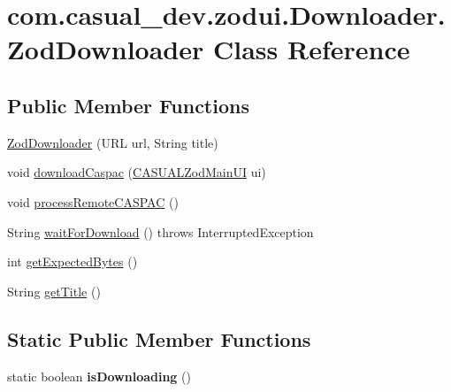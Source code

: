 \hypertarget{classcom_1_1casual__dev_1_1zodui_1_1_downloader_1_1_zod_downloader}{\section{com.\-casual\-\_\-dev.\-zodui.\-Downloader.\-Zod\-Downloader Class Reference}
\label{classcom_1_1casual__dev_1_1zodui_1_1_downloader_1_1_zod_downloader}
}
\subsection*{Public Member Functions}
\begin{DoxyCompactItemize}
\item 
\hyperlink{classcom_1_1casual__dev_1_1zodui_1_1_downloader_1_1_zod_downloader_a65d7dc35de638ea05b854ffa122a676a}{Zod\-Downloader} (U\-R\-L url, String title)
\item 
void \hyperlink{classcom_1_1casual__dev_1_1zodui_1_1_downloader_1_1_zod_downloader_a0aaf6cb62cee004e9c64ce3f2363b1c4}{download\-Caspac} (\hyperlink{classcom_1_1casual__dev_1_1zodui_1_1_c_a_s_u_a_l_zod_main_u_i}{C\-A\-S\-U\-A\-L\-Zod\-Main\-U\-I} ui)
\item 
void \hyperlink{classcom_1_1casual__dev_1_1zodui_1_1_downloader_1_1_zod_downloader_a3b8bfeff8b7059d743400f54bf1d01d0}{process\-Remote\-C\-A\-S\-P\-A\-C} ()
\item 
String \hyperlink{classcom_1_1casual__dev_1_1zodui_1_1_downloader_1_1_zod_downloader_a2f0fbc94fe3cb54647d6d4a8504dbefb}{wait\-For\-Download} ()  throws Interrupted\-Exception 
\item 
int \hyperlink{classcom_1_1casual__dev_1_1zodui_1_1_downloader_1_1_zod_downloader_a5e7f2e01f74131d0c4808d68f733bf40}{get\-Expected\-Bytes} ()
\item 
String \hyperlink{classcom_1_1casual__dev_1_1zodui_1_1_downloader_1_1_zod_downloader_acc780a01ac94c81d74aa4275c549cf72}{get\-Title} ()
\end{DoxyCompactItemize}
\subsection*{Static Public Member Functions}
\begin{DoxyCompactItemize}
\item 
\hypertarget{classcom_1_1casual__dev_1_1zodui_1_1_downloader_1_1_zod_downloader_a5773ecb1bd2fab470f4b0c86e9ba5329}{static boolean {\bfseries is\-Downloading} ()}\label{classcom_1_1casual__dev_1_1zodui_1_1_downloader_1_1_zod_downloader_a5773ecb1bd2fab470f4b0c86e9ba5329}

\end{DoxyCompactItemize}


